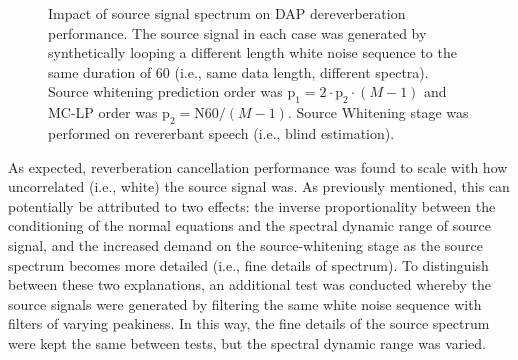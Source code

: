 \begin{figure}[H]
	\vspace{1em}
	
	\label{subfig:params_source_spectrum_compare:C}
	
	\caption[Impact of source signal spectrum on DAP dereverberation performance]{Impact of source signal spectrum on DAP dereverberation performance. The source signal in each case was generated by synthetically looping a different length white noise sequence to the same duration of \qty{60}{\sec} (i.e., same data length, different spectra). Source whitening prediction order was $\mathrm{p_1} = 2 \cdot \mathrm{p_2} \cdot (M-1)$ and MC-LP order was $\mathrm{p_2} = \mathrm{N60} / (M-1)$. Source Whitening stage was performed on revererbant speech (i.e., blind estimation).}
	\label{fig:params_source_spectrum_compare}
	
\end{figure}

As expected, reverberation cancellation performance was found to scale with how uncorrelated (i.e., white) the source signal was. As previously mentioned, this can potentially be attributed to two effects: the inverse proportionality between the conditioning of the normal equations and the spectral dynamic range of source signal, and the increased demand on the source-whitening stage as the source spectrum becomes more detailed (i.e., fine details of spectrum). To distinguish between these two explanations, an additional test was conducted whereby the source signals were generated by filtering the same white noise sequence with filters of varying peakiness. In this way, the fine details of the source spectrum were kept the same between tests, but the spectral dynamic range was varied.

